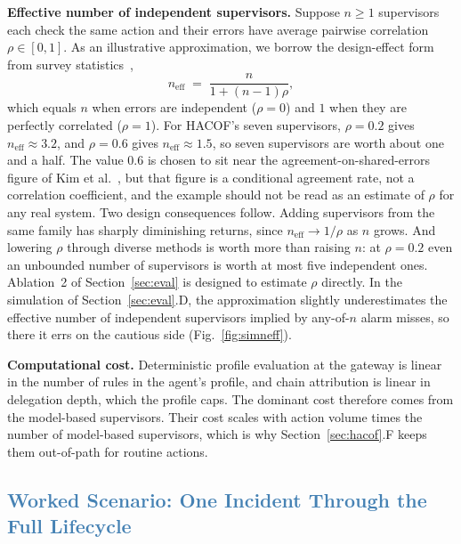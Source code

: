 \documentclass[journal]{IEEEtran}
\newcommand{\hacof}{HACOF}
\begin{document}
\textbf{Effective number of independent supervisors.} Suppose $n \ge 1$ supervisors each check the same action and their errors have average pairwise correlation $\rho \in [0,1]$. As an illustrative approximation, we borrow the design-effect form from survey statistics~\cite{kish1965survey},
\begin{equation}
n_{\text{eff}} \;=\; \frac{n}{1 + (n-1)\rho},
\label{eq:neff}
\end{equation}
which equals $n$ when errors are independent ($\rho = 0$) and $1$ when they are perfectly correlated ($\rho = 1$). For \hacof's seven supervisors, $\rho = 0.2$ gives $n_{\text{eff}} \approx 3.2$, and $\rho = 0.6$ gives $n_{\text{eff}} \approx 1.5$, so seven supervisors are worth about one and a half. The value $0.6$ is chosen to sit near the agreement-on-shared-errors figure of Kim et al.~\cite{kim2025correlated}, but that figure is a conditional agreement rate, not a correlation coefficient, and the example should not be read as an estimate of $\rho$ for any real system.
Two design consequences follow. Adding supervisors from the same family has sharply diminishing returns, since $n_{\text{eff}} \to 1/\rho$ as $n$ grows. And lowering $\rho$ through diverse methods is worth more than raising $n$: at $\rho = 0.2$ even an unbounded number of supervisors is worth at most five independent ones. Ablation~2 of Section~\ref{sec:eval} is designed to estimate $\rho$ directly. In the simulation of Section~\ref{sec:eval}.D, the approximation slightly underestimates the effective number of independent supervisors implied by any-of-$n$ alarm misses, so there it errs on the cautious side (Fig.~\ref{fig:simneff}).

\textbf{Computational cost.} Deterministic profile evaluation at the gateway is linear in the number of rules in the agent's profile, and chain attribution is linear in delegation depth, which the profile caps. The dominant cost therefore comes from the model-based supervisors. Their cost scales with action volume times the number of model-based supervisors, which is why Section~\ref{sec:hacof}.F keeps them out-of-path for routine actions.

\subsection{\textcolor{steelblue}{Worked Scenario: One Incident Through the Full Lifecycle}}
\label{sec:hacof-scenario}
\end{document}
